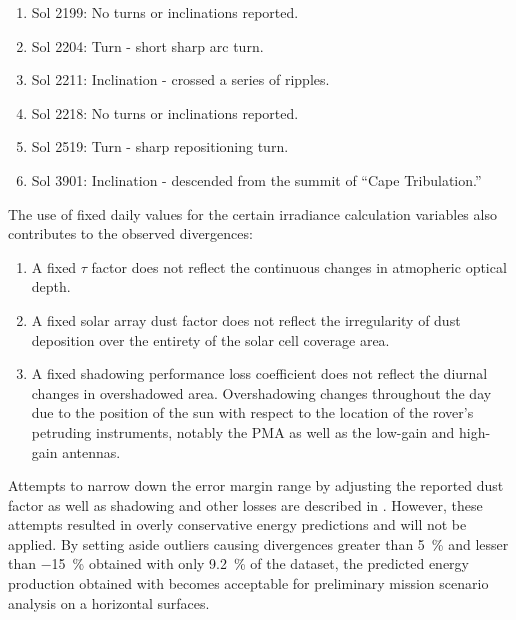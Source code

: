 \begin{enumerate}[label=\textcolor{BulletBlue}{(\alph*)}]
  \item Sol 2199: No turns or inclinations reported.
  \item Sol 2204: Turn - short sharp arc turn.
  \item Sol 2211: Inclination - crossed a series of ripples.
  \item Sol 2218: No turns or inclinations reported.
  \item Sol 2519: Turn - sharp repositioning turn.
  \item Sol 3901: Inclination - descended from the summit of ``Cape Tribulation.''
\end{enumerate}

\vspace{0.5cm}


The use of fixed daily values for the certain irradiance calculation variables also contributes to the observed divergences:

\begin{enumerate}[label=\textcolor{BulletBlue}{(\alph*)}]
  \item A fixed $\tau$ factor does not reflect the continuous changes in atmopheric optical depth.
  \item A fixed solar array dust factor does not reflect the irregularity of dust deposition over the entirety of the solar cell coverage area.
  \item A fixed shadowing performance loss coefficient does not reflect the diurnal changes in overshadowed area. Overshadowing changes throughout the day due to the position of the sun with respect to the location of the rover's petruding instruments, notably the \ac{PMA} as well as the low-gain and high-gain antennas.
\end{enumerate}

Attempts to narrow down the error margin range by adjusting the reported dust factor as well as shadowing and other losses are described in . However, these attempts resulted in overly conservative energy predictions and will not be applied. By setting aside outliers causing divergences greater than \SI{5}{\percent} and lesser than \SI{-15}{\percent} obtained with only \SI{9.2}{\percent} of the dataset, the predicted energy production obtained with  becomes acceptable for preliminary mission scenario analysis on a horizontal surfaces.

